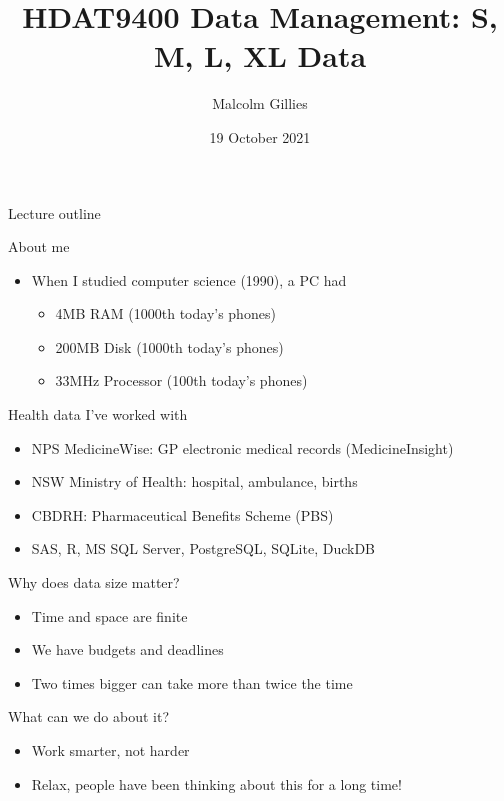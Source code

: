 \documentclass[aspectratio=169,12pt,usepdftitle=false]{beamer} %
\title{HDAT9400 Data Management: S, M, L, XL Data}
\institute{\url{https://github.com/mbg-unsw/hdat9400}}
\author{Malcolm Gillies}
\date{19 October 2021}
\begin{document}
{
\begin{frame}
\titlepage
\end{frame}
}

\begin{frame}{Lecture outline}
\end{frame}

\begin{frame}{About me}
    \begin{itemize}
        \item When I studied computer science (1990), a PC had
	    \begin{itemize}
		\item 4MB RAM (1000th today's phones)
		\item 200MB Disk (1000th today's phones)
		\item 33MHz Processor (100th today's phones)
	    \end{itemize}
    \end{itemize}
\end{frame}

\begin{frame}{Health data I've worked with}
    \begin{itemize}
	\item NPS MedicineWise: GP electronic medical records (MedicineInsight)
	\item NSW Ministry of Health: hospital, ambulance, births
	\item CBDRH: Pharmaceutical Benefits Scheme (PBS)
	\item SAS, R, MS SQL Server, PostgreSQL, SQLite, DuckDB
    \end{itemize}
\end{frame}

\begin{frame}{Why does data size matter?}
    \begin{itemize}
        \item Time and space are finite
	\item We have budgets and deadlines
	\item Two times bigger can take more than twice the time
    \end{itemize}
\end{frame}


\begin{frame}{What can we do about it?}
    \begin{itemize}
	\item Work smarter, not harder
	\item Relax, people have been thinking about this for a long time!
    \end{itemize}
\end{frame}
\end{document}
